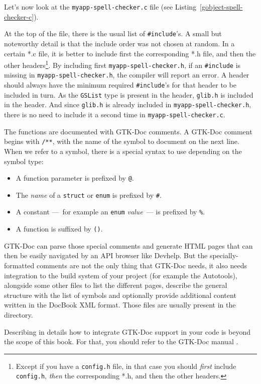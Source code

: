 Let's now look at the \texttt{myapp-spell-checker.c} file (see Listing~\ref{gobject-spell-checker-c}).

\vspace{0.7cm}


At the top of the file, there is the usual list of \lstinline{#include}'s. A small but noteworthy detail is that the include order was not chosen at random. In a certain *.c file, it is better to include first the corresponding *.h file, and then the other headers\footnote{Except if you have a \texttt{config.h} file, in that case you should \emph{first} include \texttt{config.h}, \emph{then} the corresponding *.h, and then the other headers.}. By including first \texttt{myapp-spell-checker.h}, if an \lstinline{#include} is missing in \texttt{myapp-spell-checker.h}, the compiler will report an error. A header should always have the minimum required \lstinline{#include}'s for that header to be included in turn. As the \lstinline{GSList} type is present in the header, \texttt{glib.h} is included in the header. And since \texttt{glib.h} is already included in \texttt{myapp-spell-checker.h}, there is no need to include it a second time in \texttt{myapp-spell-checker.c}.

The functions are documented with GTK-Doc comments. A GTK-Doc comment begins with \lstinline{/**}, with the name of the symbol to document on the next line. When we refer to a symbol, there is a special syntax to use depending on the symbol type:
\begin{itemize}
  \item A function parameter is prefixed by \lstinline{@}.
  \item The \emph{name} of a \lstinline{struct} or \lstinline{enum} is prefixed by \lstinline{#}.
  \item A constant ---~for example an \lstinline{enum} \emph{value}~--- is prefixed by \lstinline{%}.
  \item A function is suffixed by \lstinline{()}.
\end{itemize}

GTK-Doc can parse those special comments and generate HTML pages that can then be easily navigated by an API browser like Devhelp. But the specially-formatted comments are not the only thing that GTK-Doc needs, it also needs integration to the build system of your project (for example the Autotools), alongside some other files to list the different pages, describe the general structure with the list of symbols and optionally provide additional content written in the DocBook XML format. Those files are usually present in the  directory.

Describing in details how to integrate GTK-Doc support in your code is beyond the scope of this book. For that, you should refer to the GTK-Doc manual \cite{gtk-doc}.
